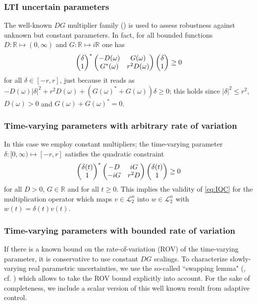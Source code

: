 \subsubsection{LTI uncertain parameters} The well-known $DG$ multiplier family (\cite{meinsmafu,fantits}) is used to assess robustness against unknown but constant parameters. In fact, for all bounded functions $D:\mathbb{R}\mapsto(0,\infty)$ and $G:\mathbb{R}\mapsto i\mathbb{R}$ one has
\begin{equation*}
\begin{pmatrix}\delta\\1\end{pmatrix}^*\begin{pmatrix}-D(\omega) &G(\omega)\\G^*(\omega) &r^2D(\omega)\end{pmatrix}\begin{pmatrix}\delta\\1\end{pmatrix}\geq 0
\end{equation*}
for all $\delta\in[-r,r]$, just because it reads as
$-D(\omega)|\delta|^2 + r^2 D(\omega) + (G(\omega)^*+G(\omega))\delta\geq 0$;
this holds since $|\delta|^2\leq r^2$, $D(\omega)>0$ and $G(\omega)+G(\omega)^*=0$.


\subsubsection{Time-varying parameters with arbitrary rate of variation}
In this case we employ constant multipliers; the time-varying parameter $\delta:[0,\infty)\mapsto [-r,r]$ satisfies the quadratic constraint
\begin{equation*}
\begin{pmatrix}\delta(t)\\1\end{pmatrix}^*\begin{pmatrix}-D &iG\\-iG &r^2D\end{pmatrix}\begin{pmatrix}\delta(t)\\1\end{pmatrix}\geq 0
\end{equation*}
for all $D>0$, $G\in\mathbb{R}$ and for all $t\geq 0$. This implies the validity of \eqref{eq:IQC} for the multiplication operator which
maps $v\in \mathcal{L}_2^n$ into $w\in\mathcal{L}_2^n$ with $w(t)=\delta(t)v(t)$.


\subsubsection{Time-varying parameters with bounded rate of variation} If there is a known bound on the rate-of-variation (ROV) of the time-varying parameter, it is conservative to use constant $DG$ scalings. To characterize slowly-varying real parametric uncertainties, we use the so-called ``swapping lemma" (\cite{helmersson,jonsson,koroglu}, cf. \cite{packardteng}) which allows to take the ROV bound explicitly into account. For the sake of completeness, we include a scalar version of this well known result from adaptive control.

